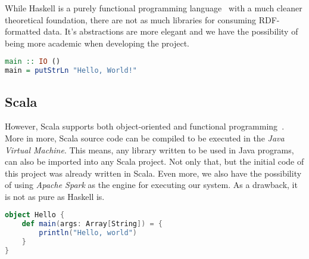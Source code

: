 While Haskell is a purely functional programming language~\cite{wiki:Haskell} with a much cleaner theoretical foundation, there are not as much libraries for consuming RDF-formatted data. It's abstractions are more elegant and we have the possibility of being more academic when developing the project.

\begin{lstlisting}[language=Haskell, caption=\textit{Hello World!} program written in Haskell]
main :: IO ()
main = putStrLn "Hello, World!"
\end{lstlisting}

\subsection{Scala}

However, Scala supports both object-oriented and functional programming~\cite{wiki:Scala_(programming_language)}. More in more, Scala source code can be compiled to be executed in the \textit{Java Virtual Machine}. This means, any library written to be used in Java programs, can also be imported into any Scala project. Not only that, but the initial code of this project was already written in Scala. Even more, we also have the possibility of using \textit{Apache Spark} as the engine for executing our system. As a drawback, it is not as pure as Haskell is.

\begin{lstlisting}[language=Scala, caption=\textit{Hello World!} program written in Scala 2]
object Hello {
    def main(args: Array[String]) = {
        println("Hello, world")
    }
}
\end{lstlisting}